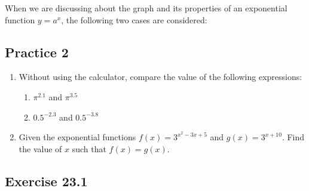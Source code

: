 \documentclass[12pt]{report}
\begin{document}
When we are discussing about the graph and its properties of an exponential
function $y = a^x$, the following two cases are considered: \newpage

\subsection*{Practice 2}

\setlength{\columnseprule}{1pt}
\setlength{\columnsep}{24pt}

\begin{multicols}{2}
  \begin{enumerate}
    \item Without using the calculator, compare the value of the following expressions:
          \begin{enumerate}
            \item $\pi^{2.1}$ and $\pi^{3.5}$
            \item $0.5^{-2.3}$ and $0.5^{-3.8}$
          \end{enumerate}

    \item Given the exponential functions $f(x) = 3^{x^2 - 3x + 5}$ and $g(x) =
            3^{x+10}$. Find the value of $x$ such that $f(x) = g(x)$.
  \end{enumerate}
\end{multicols}

\subsection*{Exercise 23.1}

\setlength{\columnseprule}{1pt}
\setlength{\columnsep}{24pt}
\end{document}
